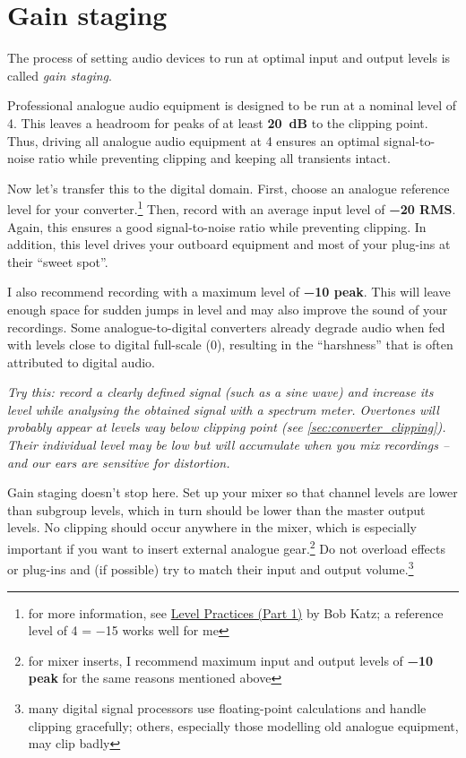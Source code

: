 \section{Gain staging}
\label{sec:gain_staging}

The process of setting audio devices to run at optimal input and
output levels is called \emph{gain staging}.

Professional analogue audio equipment is designed to be run at a
nominal level of \SI[retain-explicit-plus]{+4}{\dBu}.  This leaves a
headroom for peaks of at least \textbf{\SI{20}{\dB}} to the clipping
point.  Thus, driving all analogue audio equipment at
\SI[retain-explicit-plus]{+4}{\dBu} ensures an optimal signal-to-noise
ratio while preventing clipping and keeping all transients intact.

Now let's transfer this to the digital domain.  First, choose an
analogue reference level for your converter.\footnote{for more
  information, see
  \href{https://www.digido.com/portfolio-item/level-practices-part-1/}{Level
    Practices (Part 1)} by Bob Katz; a reference level of
  \SI[retain-explicit-plus]{+4}{\dBu} = \SI{-15}{\dBFS} works well for
  me} Then, record with an average input level of
\textbf{\SI{-20}{\dBFS} RMS}.  Again, this ensures a good
signal-to-noise ratio while preventing clipping.  In addition, this
level drives your outboard equipment and most of your plug-ins at
their ``sweet spot''.

I also recommend recording with a maximum level of
\textbf{\SI{-10}{\dBFS} peak}.  This will leave enough space for
sudden jumps in level and may also improve the sound of your
recordings.  Some analogue-to-digital converters already degrade audio
when fed with levels close to digital full-scale (\SI{0}{\dBFS}),
resulting in the ``harshness'' that is often attributed to digital
audio.

\emph{Try this: record a clearly defined signal (such as a sine wave)
  and increase its level while analysing the obtained signal with a
  spectrum meter.  Overtones will probably appear at levels way below
  clipping point (see \ref{sec:converter_clipping}).  Their individual
  level may be low but will accumulate when you mix recordings -- and
  our ears are sensitive for distortion.}

Gain staging doesn't stop here.  Set up your mixer so that channel
levels are lower than subgroup levels, which in turn should be lower
than the master output levels.  No clipping should occur anywhere in
the mixer, which is especially important if you want to insert
external analogue gear.\footnote{for mixer inserts, I recommend
  maximum input and output levels of \textbf{\SI{-10}{\dBFS} peak} for
  the same reasons mentioned above} Do not overload effects or
plug-ins and (if possible) try to match their input and output
volume.\footnote{many digital signal processors use floating-point
  calculations and handle clipping gracefully; others, especially
  those modelling old analogue equipment, may clip badly}

